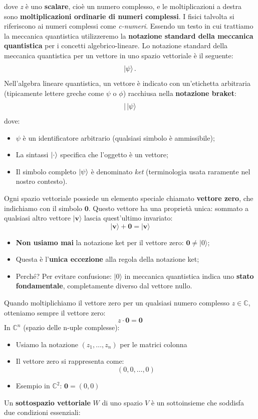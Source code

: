 \documentclass[a4paper,12pt]{report}
\theoremstyle{plain}
\begin{document}
dove \textit{z} è uno \textbf{scalare}, cioè un numero complesso, e le moltiplicazioni a destra sono \textbf{moltiplicazioni ordinarie di numeri complessi}. I fisici talvolta si riferiscono ai numeri complessi come \textit{c-numeri}. Essendo un testo in cui trattiamo la meccanica quantistica utilizzeremo la \textbf{notazione standard della meccanica quantistica} per i concetti algebrico-lineare.
Lo notazione standard della meccanica quantistica per un vettore in uno spazio vettoriale è il seguente: 
\[
\ket{\psi}.
\]
Nell'algebra lineare quantistica, un vettore è indicato con un'etichetta arbitraria (tipicamente lettere greche come $\psi$ o $\phi$) racchiusa nella \textbf{notazione braket}:
\[
|\ket{\psi}
\]
dove:
\begin{itemize}
    \item $\psi$ è un identificatore arbitrario (qualsiasi simbolo è ammissibile);
    \item La sintassi \(\ket{\cdot}\) specifica che l'oggetto è un vettore;
    \item Il simbolo completo \(\ket{\psi}\) è denominato \textit{ket} (terminologia usata raramente nel nostro contesto).
\end{itemize}
Ogni spazio vettoriale possiede un elemento speciale chiamato \textbf{vettore zero}, che indichiamo con il simbolo $\mathbf{0}$. Questo vettore ha una proprietà unica: sommato a qualsiasi altro vettore $|\mathbf{v}\rangle$ lascia quest'ultimo invariato:
\[
|\mathbf{v}\rangle + \mathbf{0} = |\mathbf{v}\rangle
\]
\begin{itemize}
  \item \textbf{Non usiamo mai} la notazione ket per il vettore zero: $\mathbf{0} \neq |0\rangle$;
  \item Questa è l'\textbf{unica eccezione} alla regola della notazione ket;
  \item Perché? Per evitare confusione: $|0\rangle$ in meccanica quantistica indica uno \textbf{stato fondamentale}, completamente diverso dal vettore nullo.
\end{itemize}
Quando moltiplichiamo il vettore zero per un qualsiasi numero complesso $z \in \mathbb{C}$, otteniamo sempre il vettore zero:
\[
z \cdot \mathbf{0} = \mathbf{0}
\]
In $\mathbb{C}^n$ (spazio delle n-uple complesse):
\begin{itemize}
  \item Usiamo la notazione $(z_1, \dots, z_n)$ per le matrici colonna
  \item Il vettore zero si rappresenta come:
\[
(0, 0, \dots, 0)
\]
  \item Esempio in $\mathbb{C}^2$: $\mathbf{0} = (0, 0)$
\end{itemize}
Un \textbf{sottospazio vettoriale} $W$ di uno spazio $V$ è un sottoinsieme che soddisfa due condizioni essenziali:
\end{document}
